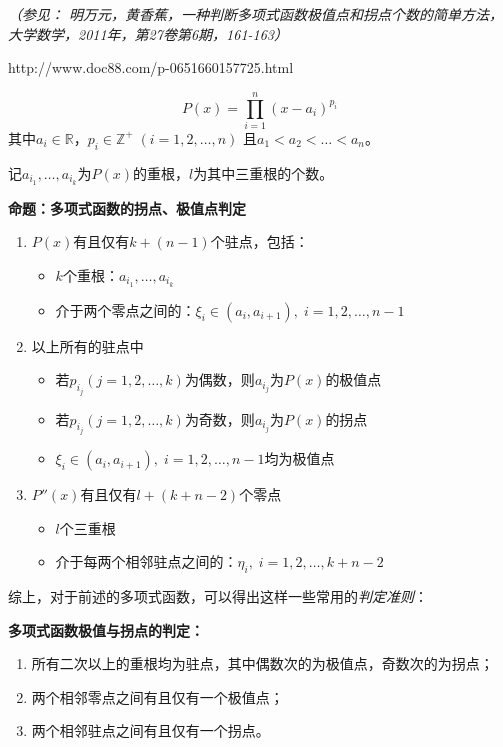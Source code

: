 \begin{shaded}
	{\it（参见： 明万元，黄香蕉，一种判断多项式函数极值点和拐点个数的简单方法，
	大学数学，2011年，第27卷第6期，161-163）
	
	http://www.doc88.com/p-0651660157725.html}
	$$P(x)=\prod_{i=1}^n(x-a_i)^{p_i}$$
	其中$a_i\in\mathbb{R}$，$p_i\in\mathbb{Z}^+\;(i=1,2,\ldots,n)$
	且$a_1<a_2<\ldots<a_n$。
	
	记$a_{i_1},\ldots,a_{i_k}$为$P(x)$的重根，$l$为其中三重根的个数。
	
	{\bf 命题：}{\bf 多项式函数的拐点、极值点判定}
	\begin{enumerate}
  	  \setlength{\itemindent}{1cm}
	  \item $P(x)$有且仅有$k+(n-1)$个驻点，包括：
	  \begin{itemize}
	    \setlength{\itemindent}{0.5cm}
	    \item $k$个重根：$a_{i_1},\ldots,a_{i_k}$
	    \item 介于两个零点之间的：$\xi_i\in(a_i,a_{i+1}),\;i=1,2,\ldots,n-1$
	  \end{itemize}
	  \item 以上所有的驻点中
	  \begin{itemize}
	    \setlength{\itemindent}{0.5cm}
	    \item 若$p_{i_j}(j=1,2,\ldots,k)$为偶数，则$a_{i_j}$为$P(x)$的极值点
	    \item 若$p_{i_j}(j=1,2,\ldots,k)$为奇数，则$a_{i_j}$为$P(x)$的拐点
	    \item $\xi_i\in(a_i,a_{i+1}),\;i=1,2,\ldots,n-1$均为极值点
	  \end{itemize}
	  \item $P''(x)$有且仅有$l+(k+n-2)$个零点
	  \begin{itemize}
	    \setlength{\itemindent}{0.5cm}
	    \item $l$个三重根
	    \item 介于每两个相邻驻点之间的：$\eta_i,\;i=1,2,\ldots,k+n-2$
	  \end{itemize}
	\end{enumerate}
	
	综上，对于前述的多项式函数，可以得出这样一些常用的{\it 判定准则}：
	\begin{tcolorbox}
		{\bf 多项式函数极值与拐点的判定：}
		\begin{enumerate}[(1)]
		  \item 所有二次以上的重根均为驻点，其中偶数次的为极值点，奇数次的为拐点；
		  \item 两个相邻零点之间有且仅有一个极值点；
		  \item 两个相邻驻点之间有且仅有一个拐点。
		\end{enumerate}
	\end{tcolorbox}	
	

\end{shaded}
